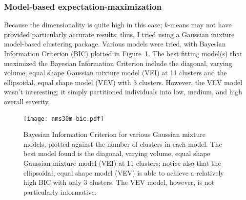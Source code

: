 \documentclass[10pt]{article}
\begin{document}
\begin{multicols}{2}


\subsubsection{Model-based expectation-maximization}

Because the dimensionality is quite high in this case; $k$-means may not have provided particularly
accurate results; thus, I tried using a Gaussian mixture model-based clustering package. Various
models were tried, with Bayesian Information Criterion (BIC) plotted in
Figure~\ref{fig:nms30m-bic}. The best
fitting model(s) that maximized the Bayesian Information Criterion include the diagonal, varying
volume, equal shape Gaussian mixture model (VEI) at 11 clusters and the ellipsoidal, equal shape
model (VEV) with 3 clusters. However, the VEV model wasn't interesting; it simply partitioned
individuals into low, medium, and high overall severity.

\begin{figure}[H]
  \centering
  \texttt{[image: nms30m-bic.pdf]}
  \caption{Bayesian Information Criterion for various Gaussian mixture models, plotted against the
  number of clusters in each model. The best model found is the diagonal, varying volume, equal
shape Gaussian mixture model (VEI) at 11 clusters; notice also that the ellipsoidal, equal shape
model (VEV) is able to achieve a relatively high BIC with only 3 clusters. The VEV model, however,
is not particularly informative.}
  \label{fig:nms30m-bic}
\end{figure}


\end{multicols}
\end{document}
